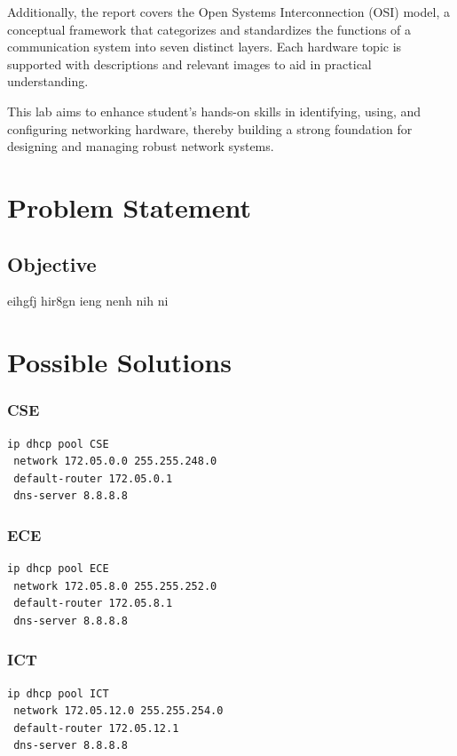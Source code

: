 \documentclass[12pt]{report}
\begin{document}
Additionally, the report covers the Open Systems Interconnection (OSI) model, a conceptual framework that categorizes and standardizes the functions of a communication system into seven distinct layers. Each hardware topic is supported with descriptions and relevant images to aid in practical understanding.

This lab aims to enhance student's hands-on skills in identifying, using, and configuring networking hardware, thereby building a strong foundation for designing and managing robust network systems.

\newpage

\chapter{Problem Statement}
\section{Objective}
\newpage
eihgfj hir8gn ieng nenh nih ni


\chapter{Possible Solutions}

\subsection{CSE}
\begin{lstlisting}[basicstyle=\ttfamily\small, frame=single]
ip dhcp pool CSE
 network 172.05.0.0 255.255.248.0
 default-router 172.05.0.1
 dns-server 8.8.8.8
\end{lstlisting}

\subsection{ECE}
\begin{lstlisting}[basicstyle=\ttfamily\small, frame=single]
ip dhcp pool ECE
 network 172.05.8.0 255.255.252.0
 default-router 172.05.8.1
 dns-server 8.8.8.8
\end{lstlisting}

\subsection{ICT}
\begin{lstlisting}[basicstyle=\ttfamily\small, frame=single]
ip dhcp pool ICT
 network 172.05.12.0 255.255.254.0
 default-router 172.05.12.1
 dns-server 8.8.8.8
\end{lstlisting}
\end{document}
